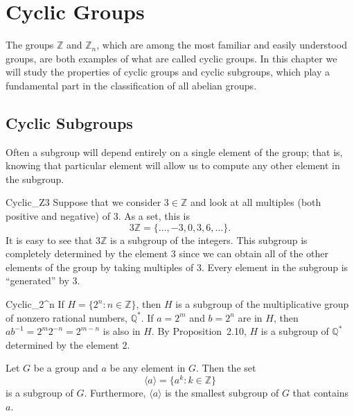 \chapter{Cyclic Groups}\label{cyclic}
 
The groups $\mathbb Z$ and ${\mathbb Z}_n$, which are among the most familiar and easily understood groups, are both examples of what are called cyclic groups.  In this chapter we will study the properties of cyclic groups and cyclic subgroups, which play a fundamental part in the classification of all abelian groups. 


\section{Cyclic Subgroups}

Often a subgroup will depend entirely on a single element of the group; that is, knowing that particular element will allow us to compute any other element in the subgroup. 

\begin{example}{Cyclic_Z3}
Suppose that we consider $3 \in {\mathbb Z}$ and look at all multiples (both positive and negative) of 3.  As a set, this is 
\[
3 {\mathbb Z} = \{ \ldots, -3, 0, 3, 6, \ldots \}.
\]
It is easy to see that $3 {\mathbb Z}$ is a subgroup of the integers.  This subgroup is completely determined by the element 3 since we can obtain all of the other elements of the group by taking multiples of 3.  Every element in the subgroup is ``generated'' by 3. 
\end{example}

\begin{example}{Cyclic_2^n}
If $H = \{ 2^n : n \in {\mathbb Z} \}$, then $H$ is a subgroup of the multiplicative group of nonzero rational numbers, ${\mathbb Q}^*$.  If $a = 2^m$ and $b = 2^n$ are in $H$, then $ab^{-1} = 2^m 2^{-n} = 2^{m-n}$ is also in $H$.  By Proposition~2.10, $H$ is a subgroup of ${\mathbb Q}^*$ determined by the element 2. 
\end{example}

\begin{theorem}
Let $G$ be a group and $a$ be any element in $G$.  Then the set
\[
\langle a \rangle  = \{ a^k : k \in {\mathbb Z} \}\label{generatedby}
\]
is a subgroup of $G$.  Furthermore, $\langle a \rangle$ is the smallest subgroup of $G$ that contains~$a$. 
\end{theorem}
 
